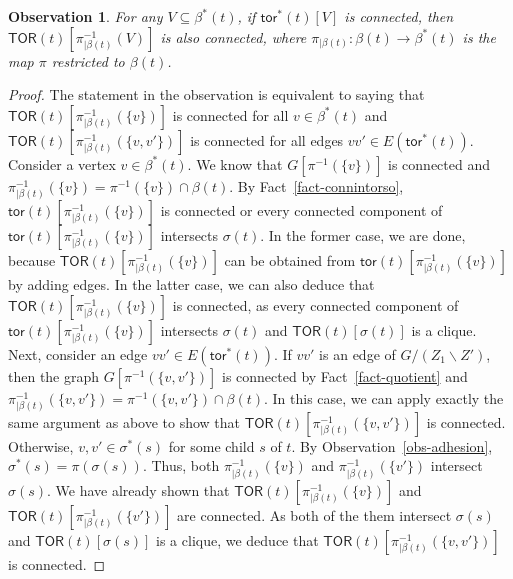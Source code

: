 \documentclass[a4paper,11pt]{article}
\numberwithin{lemma}{section}
\newtheorem{observation}[lemma]{Observation}
\newcommand{\tor}{\mathsf{tor}}
\begin{document}
\begin{observation} \label{obs-TORconnected}
For any $V \subseteq \beta^*(t)$, if $\tor^*(t)[V]$ is connected, then $\mathsf{TOR}(t)[\pi_{|\beta(t)}^{-1}(V)]$ is also connected, where $\pi_{|\beta(t)}: \beta(t) \rightarrow \beta^*(t)$ is the map $\pi$ restricted to $\beta(t)$.
\end{observation}
\begin{proof}
The statement in the observation is equivalent to saying that $\mathsf{TOR}(t)[\pi_{|\beta(t)}^{-1}(\{v\})]$ is connected for all $v \in \beta^*(t)$ and $\mathsf{TOR}(t)[\pi_{|\beta(t)}^{-1}(\{v,v'\})]$ is connected for all edges $vv' \in E(\tor^*(t))$.
Consider a vertex $v \in \beta^*(t)$.
We know that $G[\pi^{-1}(\{v\})]$ is connected and $\pi_{|\beta(t)}^{-1}(\{v\}) = \pi^{-1}(\{v\}) \cap \beta(t)$.
By Fact~\ref{fact-connintorso}, $\tor(t)[\pi_{|\beta(t)}^{-1}(\{v\})]$ is connected or every connected component of $\tor(t)[\pi_{|\beta(t)}^{-1}(\{v\})]$ intersects $\sigma(t)$.
In the former case, we are done, because $\mathsf{TOR}(t)[\pi_{|\beta(t)}^{-1}(\{v\})]$ can be obtained from $\tor(t)[\pi_{|\beta(t)}^{-1}(\{v\})]$ by adding edges.
In the latter case, we can also deduce that $\mathsf{TOR}(t)[\pi_{|\beta(t)}^{-1}(\{v\})]$ is connected, as every connected component of $\tor(t)[\pi_{|\beta(t)}^{-1}(\{v\})]$ intersects $\sigma(t)$ and $\mathsf{TOR}(t)[\sigma(t)]$ is a clique.
Next, consider an edge $vv' \in E(\tor^*(t))$.
If $vv'$ is an edge of $G/(Z_1 \backslash Z')$, then the graph $G[\pi^{-1}(\{v,v'\})]$ is connected by Fact~\ref{fact-quotient} and $\pi_{|\beta(t)}^{-1}(\{v,v'\}) = \pi^{-1}(\{v,v'\}) \cap \beta(t)$.
In this case, we can apply exactly the same argument as above to show that $\mathsf{TOR}(t)[\pi_{|\beta(t)}^{-1}(\{v,v'\})]$ is connected.
Otherwise, $v,v' \in \sigma^*(s)$ for some child $s$ of $t$.
By Observation~\ref{obs-adhesion}, $\sigma^*(s) = \pi(\sigma(s))$.
Thus, both $\pi_{|\beta(t)}^{-1}(\{v\})$ and $\pi_{|\beta(t)}^{-1}(\{v'\})$ intersect $\sigma(s)$.
We have already shown that $\mathsf{TOR}(t)[\pi_{|\beta(t)}^{-1}(\{v\})]$ and $\mathsf{TOR}(t)[\pi_{|\beta(t)}^{-1}(\{v'\})]$ are connected.
As both of the them intersect $\sigma(s)$ and $\mathsf{TOR}(t)[\sigma(s)]$ is a clique, we deduce that $\mathsf{TOR}(t)[\pi_{|\beta(t)}^{-1}(\{v,v'\})]$ is connected.
\end{proof}
\end{document}
